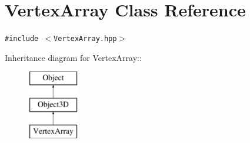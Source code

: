 \hypertarget{classm3g_1_1VertexArray}{
\section{VertexArray Class Reference}
\label{classm3g_1_1VertexArray}
}
{\tt \#include $<$VertexArray.hpp$>$}

Inheritance diagram for VertexArray::\begin{figure}[H]
\begin{center}
\leavevmode
\includegraphics[height=3cm]{classm3g_1_1VertexArray}
\end{center}
\end{figure}
